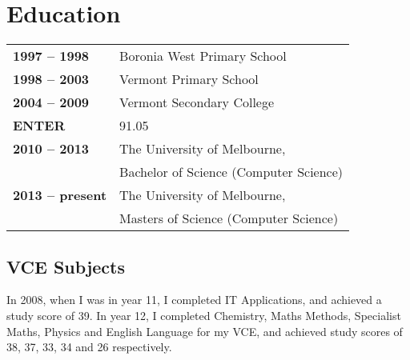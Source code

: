 \documentclass[a4paper]{article}
\begin{document}
\section{Education}
\begin{tabular}{>{\raggedright}m{3cm} l}
    \textbf{1997 -- 1998} &Boronia West Primary School\\
    \textbf{1998 -- 2003} &Vermont Primary School\\
    \textbf{2004 -- 2009} &Vermont Secondary College\\
           \textbf{ENTER} &91.05\\
    \textbf{2010 -- 2013} &The University of Melbourne, \\
                             &Bachelor of Science (Computer Science)\\
    \textbf{2013 -- present} &The University of Melbourne, \\
                             &Masters of Science (Computer Science)\\
\end{tabular}

\subsection{VCE Subjects}
In 2008, when I was in year 11, I completed IT Applications, and achieved a 
study score of 39. In year 12, I completed Chemistry, Maths Methods,
Specialist Maths, Physics and English Language for my VCE, and achieved 
study scores of 38, 37, 33, 34 and 26 respectively.
\end{document}
